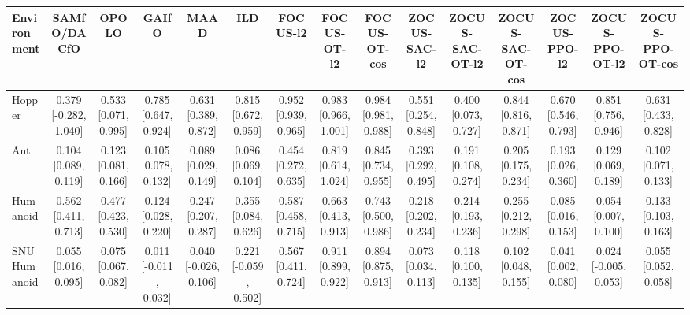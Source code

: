 \begin{tabular}{lcccccccccccccc}
\toprule
Environment & SAMfO/DACfO & OPOLO & GAIfO & MAAD & ILD & FOCUS-l2 & FOCUS-OT-l2 & FOCUS-OT-cos & ZOCUS-SAC-l2 & ZOCUS-SAC-OT-l2 & ZOCUS-SAC-OT-cos & ZOCUS-PPO-l2 & ZOCUS-PPO-OT-l2 & ZOCUS-PPO-OT-cos \\
\midrule
Hopper & 0.379 [-0.282, 1.040] & 0.533 [0.071, 0.995] & 0.785 [0.647, 0.924] & 0.631 [0.389, 0.872] & 0.815 [0.672, 0.959] & 0.952 [0.939, 0.965] & 0.983 [0.966, 1.001] & 0.984 [0.981, 0.988] & 0.551 [0.254, 0.848] & 0.400 [0.073, 0.727] & 0.844 [0.816, 0.871] & 0.670 [0.546, 0.793] & 0.851 [0.756, 0.946] & 0.631 [0.433, 0.828] \\
Ant & 0.104 [0.089, 0.119] & 0.123 [0.081, 0.166] & 0.105 [0.078, 0.132] & 0.089 [0.029, 0.149] & 0.086 [0.069, 0.104] & 0.454 [0.272, 0.635] & 0.819 [0.614, 1.024] & 0.845 [0.734, 0.955] & 0.393 [0.292, 0.495] & 0.191 [0.108, 0.274] & 0.205 [0.175, 0.234] & 0.193 [0.026, 0.360] & 0.129 [0.069, 0.189] & 0.102 [0.071, 0.133] \\
Humanoid & 0.562 [0.411, 0.713] & 0.477 [0.423, 0.530] & 0.124 [0.028, 0.220] & 0.247 [0.207, 0.287] & 0.355 [0.084, 0.626] & 0.587 [0.458, 0.715] & 0.663 [0.413, 0.913] & 0.743 [0.500, 0.986] & 0.218 [0.202, 0.234] & 0.214 [0.193, 0.236] & 0.255 [0.212, 0.298] & 0.085 [0.016, 0.153] & 0.054 [0.007, 0.100] & 0.133 [0.103, 0.163] \\
SNU Humanoid & 0.055 [0.016, 0.095] & 0.075 [0.067, 0.082] & 0.011 [-0.011, 0.032] & 0.040 [-0.026, 0.106] & 0.221 [-0.059, 0.502] & 0.567 [0.411, 0.724] & 0.911 [0.899, 0.922] & 0.894 [0.875, 0.913] & 0.073 [0.034, 0.113] & 0.118 [0.100, 0.135] & 0.102 [0.048, 0.155] & 0.041 [0.002, 0.080] & 0.024 [-0.005, 0.053] & 0.055 [0.052, 0.058] \\
\bottomrule
\end{tabular}
